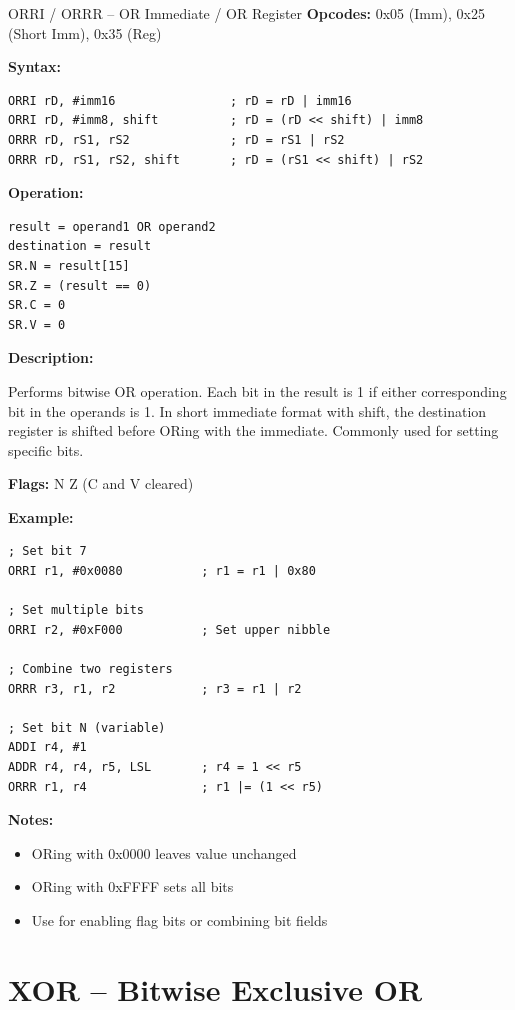 \begin{instructionbox}{ORRI / ORRR -- OR Immediate / OR Register}
	\textbf{Opcodes:} 0x05 (Imm), 0x25 (Short Imm), 0x35 (Reg)

	\textbf{Syntax:}
	\begin{lstlisting}
ORRI rD, #imm16                ; rD = rD | imm16
ORRI rD, #imm8, shift          ; rD = (rD << shift) | imm8
ORRR rD, rS1, rS2              ; rD = rS1 | rS2
ORRR rD, rS1, rS2, shift       ; rD = (rS1 << shift) | rS2
\end{lstlisting}

	\textbf{Operation:}
	\begin{verbatim}
result = operand1 OR operand2
destination = result
SR.N = result[15]
SR.Z = (result == 0)
SR.C = 0
SR.V = 0
\end{verbatim}

	\textbf{Description:}

	Performs bitwise OR operation. Each bit in the result is 1 if either corresponding bit in the operands is 1. In short
	immediate format with shift, the destination register is shifted before ORing with the immediate. Commonly used for
	setting specific bits.

	\textbf{Flags:} N Z (C and V cleared)

	\textbf{Example:}
	\begin{lstlisting}
; Set bit 7
ORRI r1, #0x0080           ; r1 = r1 | 0x80

; Set multiple bits
ORRI r2, #0xF000           ; Set upper nibble

; Combine two registers
ORRR r3, r1, r2            ; r3 = r1 | r2

; Set bit N (variable)
ADDI r4, #1
ADDR r4, r4, r5, LSL       ; r4 = 1 << r5
ORRR r1, r4                ; r1 |= (1 << r5)
\end{lstlisting}

	\textbf{Notes:}
	\begin{itemize}
		\item ORing with 0x0000 leaves value unchanged
		\item ORing with 0xFFFF sets all bits
		\item Use for enabling flag bits or combining bit fields
	\end{itemize}
\end{instructionbox}

\section{XOR -- Bitwise Exclusive OR}

